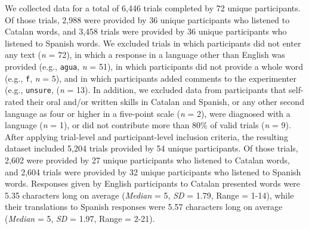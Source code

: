 \documentclass[
]{article}
\begin{document}
We collected data for a total of 6,446 trials completed by 72 unique
participants. Of those trials, 2,988 were provided by 36 unique
participants who listened to Catalan words, and 3,458 trials were
provided by 36 unique participants who listened to Spanish words. We
excluded trials in which participants did not enter any text (\emph{n} =
72), in which a response in a language other than English was provided
(e.g., \texttt{agua}, \emph{n} = 51), in which participants did not
provide a whole word (e.g., \texttt{f}, \emph{n} = 5), and in which
participants added comments to the experimenter (e.g., \texttt{unsure},
(\emph{n} = 13). In addition, we excluded data from participants that
self-rated their oral and/or written skills in Catalan and Spanish, or
any other second language as four or higher in a five-point scale
(\emph{n} = 2), were diagnosed with a language (\emph{n} = 1), or did
not contribute more than 80\% of valid trials (\emph{n} = 9). After
applying trial-level and participant-level inclusion criteria, the
resulting dataset included 5,204 trials provided by 54 unique
participants. Of those trials, 2,602 were provided by 27 unique
participants who listened to Catalan words, and 2,604 trials were
provided by 32 unique participants who listened to Spanish words.
Responses given by English participants to Catalan presented words were
5.35 characters long on average (\emph{Median} = 5, \emph{SD} = 1.79,
Range = 1-14), while their translations to Spanish responses were 5.57
characters long on average (\emph{Median} = 5, \emph{SD} = 1.97, Range =
2-21).

\captionsetup{labelsep=none}
\end{document}
